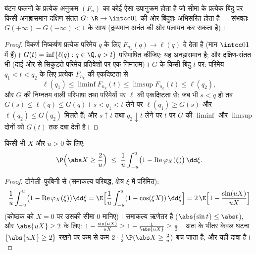\begin{theorem}[हेली की चयन प्रमेय]
\label{thm:b3:clt:helly}
बंटन फलनों के प्रत्येक अनुक्रम $(F_n)$ का कोई ऐसा उपानुक्रम होता है
जो सीमा के प्रत्येक  बिंदु पर किसी अनह्रासमान दक्षिण-संतत
$G \colon
\R \to \intcc01$ की ओर बिंदुशः अभिसरित होता है --- संभवतः $G(+\infty) - G(-\infty) <
1$ के साथ (द्रव्यमान
अनंत की ओर पलायन कर सकता है)।
\end{theorem}

\begin{proof}
विकर्ण निष्कर्षण प्रत्येक परिमेय $q$ के लिए $F_{n_k}(q) \to \ell(q)$ दे देता है
(मान  $\intcc01$ में हैं)। $G(t) = \inf\{\ell(q) : q \in \Q, q > t\}$ परिभाषित कीजिए: यह अनह्रासमान है;
और दक्षिण-संतत भी (दाईं ओर से सिकुड़ते परिमेय प्रतिवेशों पर एक
निम्नतम)। $G$ के किसी  बिंदु $t$ पर: परिमेय $q_1 < t < q_2$ के
लिए प्रत्येक $F_{n_k}$ की एकदिष्टता से
\[
\ell(q_1) \leq \liminf F_{n_k}(t) \leq \limsup F_{n_k}(t)
\leq \ell(q_2),
\]
और $G$ की निम्नतम वाली परिभाषा तथा परिमेयों पर $\ell$ की एकदिष्टता
से: जब भी $s < q$ हो तब $G(s) \leq \ell(q) \leq G(q)$। $s < q_1 < t$ लेने पर $\ell(q_1) \geq G(s)$ और $\ell(q_2) \leq G(q_2)$ मिलते
हैं; और $s \uparrow t$ तथा $q_2
\downarrow t$ लेने पर $t$ पर $G$ की  $\liminf$ और
$\limsup$ दोनों को $G(t)$ तक दबा देती है।
\end{proof}

\begin{lemma}
\label{lem:b3:clt:tightness}
किसी भी  $X$ और $u > 0$ के लिए:
\[
\P\Bigl(\abs X \geq \frac2u\Bigr) \;\leq\;
\frac1u\int_{-u}^{u}\bigl(1 -
\operatorname{Re}\varphi_X(\xi)\bigr)\,\dd\xi .
\]
\end{lemma}

\begin{proof}
टोनेली--फुबिनी से (समाकल्य परिबद्ध, क्षेत्र $\xi$ में परिमित):
\[
\frac1u\int_{-u}^u\bigl(1 -
\operatorname{Re}\varphi_X(\xi)\bigr)\dd\xi
= \E\Bigl[\frac1u\int_{-u}^u(1 - \cos(\xi X))\,\dd\xi\Bigr]
= 2\,\E\Bigl[1 - \frac{\sin(uX)}{uX}\Bigr]
\]
(कोष्ठक को $X = 0$ पर उसकी सीमा $0$ मानिए)। समाकल्य ऋणेतर है
($\abs{\sin t} \leq \abs t$), और $\abs{uX} \geq 2$ के लिए: $1 - \frac{\sin(uX)}{uX} \geq 1 -
\frac1{\abs{uX}} \geq \frac12$। अतः  के भीतर केवल घटना
$\{\abs{uX} \geq 2\}$ रखने पर कम से कम $2 \cdot \frac12\,\P(\abs X \geq \frac2u)$ बच जाता है, और यही दावा है।
\end{proof}

